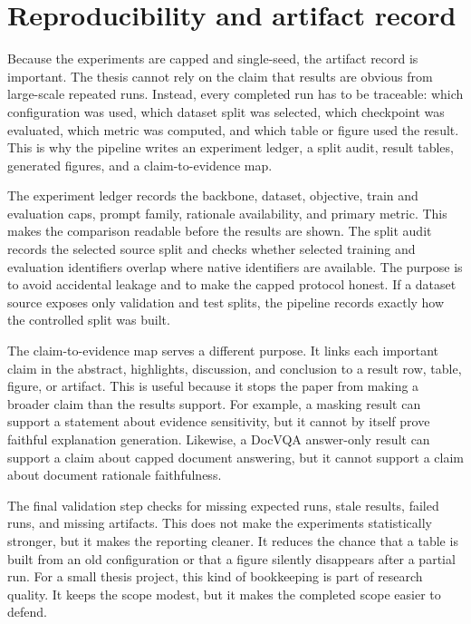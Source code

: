 \section{Reproducibility and artifact record}
Because the experiments are capped and single-seed, the artifact record is important.
The thesis cannot rely on the claim that results are obvious from large-scale repeated runs.
Instead, every completed run has to be traceable: which configuration was used, which dataset split was selected, which checkpoint was evaluated, which metric was computed, and which table or figure used the result.
This is why the pipeline writes an experiment ledger, a split audit, result tables, generated figures, and a claim-to-evidence map.

The experiment ledger records the backbone, dataset, objective, train and evaluation caps, prompt family, rationale availability, and primary metric.
This makes the comparison readable before the results are shown.
The split audit records the selected source split and checks whether selected training and evaluation identifiers overlap where native identifiers are available.
The purpose is to avoid accidental leakage and to make the capped protocol honest.
If a dataset source exposes only validation and test splits, the pipeline records exactly how the controlled split was built.

The claim-to-evidence map serves a different purpose.
It links each important claim in the abstract, highlights, discussion, and conclusion to a result row, table, figure, or artifact.
This is useful because it stops the paper from making a broader claim than the results support.
For example, a masking result can support a statement about evidence sensitivity, but it cannot by itself prove faithful explanation generation.
Likewise, a DocVQA answer-only result can support a claim about capped document answering, but it cannot support a claim about document rationale faithfulness.

The final validation step checks for missing expected runs, stale results, failed runs, and missing artifacts.
This does not make the experiments statistically stronger, but it makes the reporting cleaner.
It reduces the chance that a table is built from an old configuration or that a figure silently disappears after a partial run.
For a small thesis project, this kind of bookkeeping is part of research quality.
It keeps the scope modest, but it makes the completed scope easier to defend.
